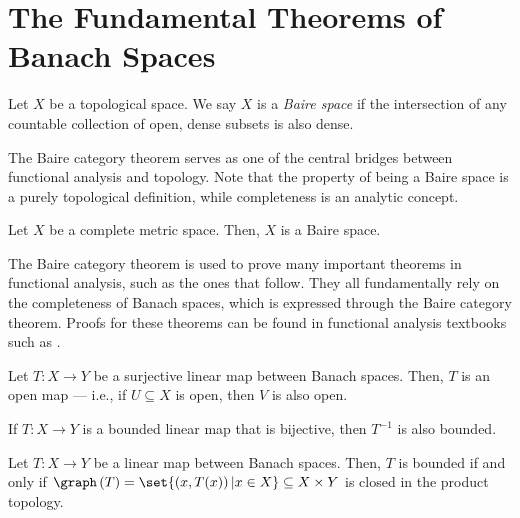 \section{The Fundamental Theorems of Banach Spaces}%
\begin{definition}
  Let $X$ be a topological space. We say $X$ is a \textit{Baire space} if the intersection of any countable collection of open, dense subsets is also dense.
\end{definition}
The Baire category theorem serves as one of the central bridges between functional analysis and topology. Note that the property of being a Baire space is a purely topological definition, while completeness is an analytic concept.
\begin{theorem}\label{thm:baire}
  Let $X$ be a complete metric space. Then, $X$ is a Baire space.
\end{theorem}
The Baire category theorem is used to prove many important theorems in functional analysis, such as the ones that follow. They all fundamentally rely on the completeness of Banach spaces, which is expressed through the Baire category theorem. Proofs for these theorems can be found in functional analysis textbooks such as \cite{rudin_functional_analysis}.
\begin{theorem}\label{thm:open_mapping}
  Let $T\colon X\rightarrow Y$ be a surjective linear map between Banach spaces. Then, $T$ is an open map --- i.e., if $U\subseteq X$ is open, then $V$ is also open.
\end{theorem}
\begin{corollary}\label{cor:bounded_inverse}
  If $T\colon X\rightarrow Y$ is a bounded linear map that is bijective, then $T^{-1}$ is also bounded.
\end{corollary}
\begin{theorem}\label{thm:closed_graph}
  Let $T\colon X\rightarrow Y$ be a linear map between Banach spaces. Then, $T$ is bounded if and only if $\graph\left(T\right) = \set{\left(x,T(x)\right)| x\in X} \subseteq X\times Y$ is closed in the product topology.
\end{theorem}
